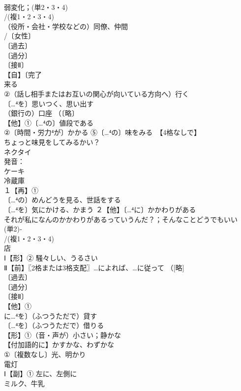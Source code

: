 \documentclass[8pt]{extreport}
\begin{document}
\begin{CJK}{UTF8}{min}
\\	弱変化；(単2・3・4)
\\	/(複1・2・3・4)
\\	（役所・会社・学校などの）同僚、仲間
\\	/〔女性〕
\\	〔過去〕
\\	〔過分〕
\\	〔接Ⅱ〕
\\	【自】〔完了
\\	来る
\\	②（話し相手またはお互いの関心が向いている方向へ）行く 
\\	〔…⁴を〕思いつく、思い出す
\\	（銀行の）口座 （〔略〕
\\	【他】①〔…⁴の〕値段である
\\	②〔時間・労力⁴が〕かかる ⑤〔…⁴の〕味をみる　【4格なしで】
\\	ちょっと味見をしてみるかい？ 
\\	ネクタイ 
\\	発音：
\\	ケーキ 
\\	冷蔵庫 
\\	１【再】①
\\	〔…⁴の〕めんどうを見る、世話をする 
\\	〔…⁴を〕気にかける、かまう ２【他】〔…⁴に〕かかわりがある　
\\	それが私になんのかかわりがあるっていうんだ？；そんなことどうでもいい
\\	(単2)‐
\\	/(複1・2・3・4)
\\	店 
\\	Ⅰ【形】② 騒々しい、うるさい
\\	Ⅱ【前】〖2格または3格支配〗…によれば、…に従って （[略]
\\	〔過去〕
\\	〔過分〕
\\	〔接Ⅱ〕
\\	【他】①
\\	に…⁴を〕（ふつうただで）貸す
\\	〔…⁴を〕（ふつうただで）借りる 
\\	【形】①（音・声が）小さい；静かな 
\\	【付加語的に】かすかな、わずかな
\\	①〔複数なし〕光、明かり 
\\	電灯
\\	Ⅰ【副】① 左に、左側に
\\	ミルク、牛乳 

\end{CJK}
\end{document}
